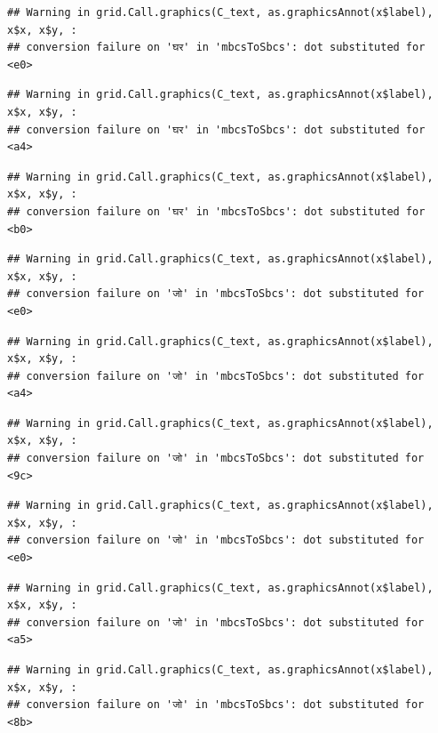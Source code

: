 \documentclass[
]{article}
\begin{document}
\begin{verbatim}
## Warning in grid.Call.graphics(C_text, as.graphicsAnnot(x$label), x$x, x$y, :
## conversion failure on 'घर' in 'mbcsToSbcs': dot substituted for <e0>
\end{verbatim}

\begin{verbatim}
## Warning in grid.Call.graphics(C_text, as.graphicsAnnot(x$label), x$x, x$y, :
## conversion failure on 'घर' in 'mbcsToSbcs': dot substituted for <a4>
\end{verbatim}

\begin{verbatim}
## Warning in grid.Call.graphics(C_text, as.graphicsAnnot(x$label), x$x, x$y, :
## conversion failure on 'घर' in 'mbcsToSbcs': dot substituted for <b0>
\end{verbatim}

\begin{verbatim}
## Warning in grid.Call.graphics(C_text, as.graphicsAnnot(x$label), x$x, x$y, :
## conversion failure on 'जो' in 'mbcsToSbcs': dot substituted for <e0>
\end{verbatim}

\begin{verbatim}
## Warning in grid.Call.graphics(C_text, as.graphicsAnnot(x$label), x$x, x$y, :
## conversion failure on 'जो' in 'mbcsToSbcs': dot substituted for <a4>
\end{verbatim}

\begin{verbatim}
## Warning in grid.Call.graphics(C_text, as.graphicsAnnot(x$label), x$x, x$y, :
## conversion failure on 'जो' in 'mbcsToSbcs': dot substituted for <9c>
\end{verbatim}

\begin{verbatim}
## Warning in grid.Call.graphics(C_text, as.graphicsAnnot(x$label), x$x, x$y, :
## conversion failure on 'जो' in 'mbcsToSbcs': dot substituted for <e0>
\end{verbatim}

\begin{verbatim}
## Warning in grid.Call.graphics(C_text, as.graphicsAnnot(x$label), x$x, x$y, :
## conversion failure on 'जो' in 'mbcsToSbcs': dot substituted for <a5>
\end{verbatim}

\begin{verbatim}
## Warning in grid.Call.graphics(C_text, as.graphicsAnnot(x$label), x$x, x$y, :
## conversion failure on 'जो' in 'mbcsToSbcs': dot substituted for <8b>
\end{verbatim}
\end{document}
